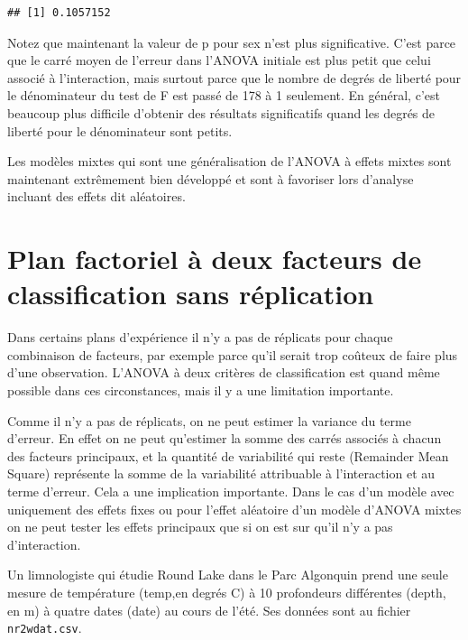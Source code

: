 \documentclass[12pt,]{book}
\makeatletter
\newenvironment{kframe}{%
\medskip{}
\setlength{\fboxsep}{.8em}
\def\at@end@of@kframe{}%
\ifinner\ifhmode%
 \def\at@end@of@kframe{\end{minipage}}%
 \begin{minipage}{\columnwidth}%
\fi\fi%
\def\FrameCommand##1{\hskip\@totalleftmargin \hskip-\fboxsep
\colorbox{incolor}{##1}\hskip-\fboxsep
    \hskip-\linewidth \hskip-\@totalleftmargin \hskip\columnwidth}%
\MakeFramed {\advance\hsize-\width
  \@totalleftmargin\z@ \linewidth\hsize
  \@setminipage}}%
{\par\unskip\endMakeFramed%
\at@end@of@kframe}
\newenvironment{rmdblock}[1]
 {
 \begin{itemize}
 \renewcommand{\labelitemi}{
   \raisebox{-.7\height}[0pt][0pt]{
     {\setkeys{Gin}{width=3em,keepaspectratio}\texttt{[image: images/\#1]}}
   }
 }
 \begin{kframe}
 \setlength{\fboxsep}{1em}
 \item
 }
 {
 \end{kframe}
 \end{itemize}
 }
\newenvironment{rmdnote}
  {\begin{rmdblock}{note}}
  {\end{rmdblock}}
\newenvironment{rmdwarning}
  {\begin{rmdblock}{warning}}
  {\end{rmdblock}}
\makeatother
\begin{document}
\begin{verbatim}
## [1] 0.1057152
\end{verbatim}

Notez que maintenant la valeur de p pour sex n'est plus significative. C'est parce que le carré moyen de l'erreur dans l'ANOVA initiale est plus petit que celui associé à l'interaction, mais surtout parce que le nombre de degrés de liberté pour le dénominateur du test de F est passé de 178 à 1 seulement. En général, c'est beaucoup plus difficile d'obtenir des résultats significatifs quand les degrés de liberté pour le dénominateur sont petits.

\begin{rmdnote}
Les modèles mixtes qui sont une généralisation de l'ANOVA à effets mixtes sont maintenant extrêmement bien développé et sont à favoriser lors d'analyse incluant des effets dit aléatoires.
\end{rmdnote}

\hypertarget{plan-factoriel-uxe0-deux-facteurs-de-classification-sans-ruxe9plication}{%
\section{Plan factoriel à deux facteurs de classification sans réplication}\label{plan-factoriel-uxe0-deux-facteurs-de-classification-sans-ruxe9plication}}

Dans certains plans d'expérience il n'y a pas de réplicats pour chaque combinaison de facteurs, par exemple parce qu'il serait trop coûteux de faire plus d'une observation. L'ANOVA à deux critères de classification est quand même possible dans ces circonstances, mais il y a une limitation importante.

\begin{rmdwarning}
Comme il n'y a pas de réplicats, on ne peut estimer la variance du terme d'erreur. En effet on ne peut qu'estimer la somme des carrés associés à chacun des facteurs principaux, et la quantité de variabilité qui reste (Remainder Mean Square) représente la somme de la variabilité attribuable à l'interaction et au terme d'erreur. Cela a une implication importante. Dans le cas d'un modèle avec uniquement des effets fixes ou pour l'effet aléatoire d'un modèle d'ANOVA mixtes on ne peut tester les effets principaux que si on est sur qu'il n'y a pas d'interaction.
\end{rmdwarning}

Un limnologiste qui étudie Round Lake dans le Parc Algonquin prend une seule mesure de température (temp,en degrés C) à 10 profondeurs différentes (depth, en m) à quatre dates (date) au cours de l'été. Ses données sont au fichier \texttt{nr2wdat.csv}.
\end{document}
